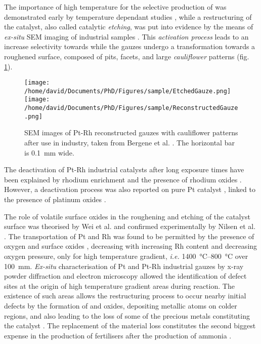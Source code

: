 The importance of high temperature for the selective production of  was demonstrated early by temperature dependant studies \parencite{Nutt1968, Pignet1974, Li1997}, while a restructuring of the catalyst, also called catalytic \textit{etching}, was put into evidence by the means of \textit{ex-situ} SEM imaging of industrial samples \parencite{McCabe1974, FlytzaniStephanopoulos1979, McCabe1986}.
This \textit{activation process} leads to an increase selectivity towards  while the gauzes undergo a transformation towards a roughened surface, composed of pits, facets, and large \textit{cauliflower} patterns (fig. \ref{fig:Gauzes}).

\begin{figure}[!htb]
    \centering
    \texttt{[image: /home/david/Documents/PhD/Figures/sample/EtchedGauze.png]}
    \texttt{[image: /home/david/Documents/PhD/Figures/sample/ReconstructedGauze.png]}
    \caption{
    SEM images of Pt-Rh reconstructed gauzes with cauliflower patterns after use in industry, taken from Bergene et al. \parencite*{Bergene1996}.
    The horizontal bar is \qty{0.1}{\mm} wide.
    }
    \label{fig:Gauzes}
\end{figure}

The deactivation of Pt-Rh industrial catalysts after long exposure times have been explained by rhodium enrichment and the presence of rhodium oxides \parencite{Fierro1992, Bergene1996}.
However, a deactivation process was also reported on pure Pt catalyst \parencite{Ostermaier1974}, linked to the presence of platinum oxides \parencite{Ostermaier1976}.

The role of volatile surface oxides in the roughening and etching of the catalyst surface was theorised by Wei et al. \parencite*{Wei1996} and confirmed experimentally by Nilsen et al. \parencite*{Nilsen2001}.
The transportation of Pt and Rh was found to be permitted by the presence of oxygen and surface oxides \parencite{Hannevold2005a}, decreasing with increasing Rh content and decreasing oxygen pressure, only for high temperature gradient, \textit{i.e.} \qtyrange{1400}{800}{\degreeCelsius} over \qty{100}{\mm}.
\textit{Ex-situ} characterisation of Pt and Pt-Rh industrial gauzes by x-ray powder diffraction and electron microscopy allowed the identification of defect sites at the origin of high temperature gradient areas during reaction.
The existence of such areas allows the restructuring process to occur nearby initial defects by the formation of  and  oxides, depositing metallic atoms on colder regions, and also leading to the loss of some of the precious metals constituting the catalyst \parencite{Hannevold2005}.
The replacement of the material loss constitutes the second biggest expense in the production of fertilisers after the production of ammonia \parencite{Hatscher2008}.

